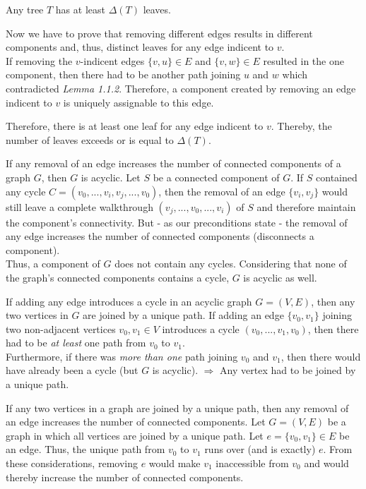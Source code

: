 \documentclass[a4paper]{article}
\begin{document}
\begin{solution}{1}
\begin{theorem}{Any tree $T$ has at least $\Delta(T)$ leaves.}
\begin{itemize}
Now we have to prove that removing different edges results in different components and, thus, distinct leaves for any edge indicent to $v$.\\
				If removing the $v$-indicent edges $\{v, u\} \in E$ and $\{v, w\} \in E$ resulted in the one component, then there had to be another path joining $u$ and $w$ which contradicted \emph{Lemma 1.1.2}. Therefore, a component created by removing an edge indicent to $v$ is uniquely assignable to this edge.
	\end{itemize}
			Therefore, there is at least one leaf for any edge indicent to $v$. Thereby, the number of leaves exceeds or is equal to $\Delta(T)$.
		\end{theorem}
	\end{solution}
	\newpage
	\begin{solution}{2}
		\begin{theorem}{If any removal of an edge increases the number of connected components of a graph $G$, then $G$ is acyclic.}
			Let $S$ be a connected component of $G$. If $S$ contained any cycle $C = (v_0, ..., v_i, v_j, ..., v_0)$, then the removal of an edge $\{v_i, v_j\}$ would still leave a complete walkthrough $(v_j, ..., v_0, ..., v_i)$ of $S$ and therefore maintain the component's connectivity.
			But - as our preconditions state - the removal of any edge increases the number of connected components (disconnects a component).\\ Thus, a component of $G$ does not contain any cycles. Considering that none of the graph's connected components contains a cycle, $G$ is acyclic as well.
		\end{theorem}
		\begin{theorem}{If adding any edge introduces a cycle in an acyclic graph $G = (V, E)$, then any two vertices in $G$ are joined by a unique path.}
			If adding an edge $\{v_0, v_1\}$ joining two non-adjacent vertices $v_0, v_1 \in V$ introduces a cycle $(v_0, ..., v_1, v_0)$, then there had to be \emph{at least} one path from $v_0$ to $v_1$.\\
			Furthermore, if there was \emph{more than one} path joining $v_0$ and $v_1$, then there would have already been a cycle (but $G$ is acyclic). $\Rightarrow$ Any vertex had to be joined by a unique path.
		\end{theorem}
		\begin{theorem}{If any two vertices in a graph are joined by a unique path, then any removal of an edge increases the number of connected components.}
			Let $G = (V, E)$ be a graph in which all vertices are joined by a unique path. Let $e = \{v_0, v_1\} \in E$ be an edge. Thus, the unique path from $v_0$ to $v_1$ runs over (and is exactly) $e$. From these considerations, removing $e$ would make $v_1$ inaccessible from $v_0$ and would thereby increase the number of connected components.
		\end{theorem}
	\end{solution} 
\end{document}
